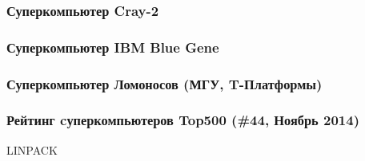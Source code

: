 \begin{frame}
\frametitle{Суперкомпьютер Cray-2}
\end{frame}

\begin{frame}
\frametitle{Суперкомпьютер IBM Blue Gene}
\end{frame}

\begin{frame}
\frametitle{Суперкомпьютер Ломоносов (МГУ, T-Платформы)}
\end{frame}

\begin{frame}
\frametitle{Рейтинг cуперкомпьютеров Top500 (\#44, Ноябрь 2014)}
\small LINPACK
\end{frame}



